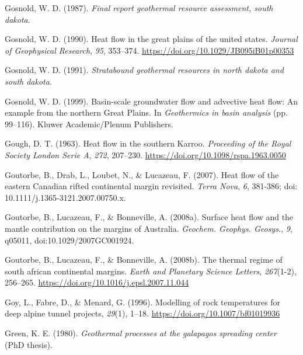 \begin{CSLReferences}{1}{1}
\leavevmode{}%
Gosnold, W. D. (1987). \emph{Final report geothermal resource assessment, south dakota}.

\leavevmode{}%
Gosnold, W. D. (1990). Heat flow in the great plains of the united states. \emph{Journal of Geophysical Research}, \emph{95}, 353--374. \url{https://doi.org/10.1029/JB095iB01p00353}

\leavevmode{}%
Gosnold, W. D. (1991). \emph{Stratabound geothermal resources in north dakota and south dakota}.

\leavevmode{}%
Gosnold, W. D. (1999). Basin-scale groundwater flow and advective heat flow: An example from the northern {Great Plains}. In \emph{Geothermics in basin analysis} (pp. 99--116). Kluwer Academic/Plenum Publishers.

\leavevmode{}%
Gough, D. T. (1963). Heat flow in the southern {Karroo}. \emph{Proceeding of the Royal Society London Serie A}, \emph{272}, 207--230. \url{https://doi.org/10.1098/rspa.1963.0050}

\leavevmode{}%
Goutorbe, B., Drab, L., Loubet, N., \& Lucazeau, F. (2007). Heat flow of the eastern {Canadian} rifted continental margin revisited. \emph{Terra Nova}, \emph{6}, 381-386; doi: 10.1111/j.1365-3121.2007.00750.x.

\leavevmode{}%
Goutorbe, B., Lucazeau, F., \& Bonneville, A. (2008a). Surface heat flow and the mantle contribution on the margins of {Australia}. \emph{Geochem. Geophys. Geosys.}, \emph{9}, q05011, doi:10.1029/2007GC001924.

\leavevmode{}%
Goutorbe, B., Lucazeau, F., \& Bonneville, A. (2008b). The thermal regime of south african continental margins. \emph{Earth and Planetary Science Letters}, \emph{267}(1-2), 256--265. \url{https://doi.org/10.1016/j.epsl.2007.11.044}

\leavevmode{}%
Goy, L., Fabre, D., \& Menard, G. (1996). Modelling of rock temperatures for deep alpine tunnel projects, \emph{29}(1), 1--18. \url{https://doi.org/10.1007/bf01019936}

\leavevmode{}%
Green, K. E. (1980). \emph{Geothermal processes at the galapagos spreading center} (PhD thesis).


\end{CSLReferences}

